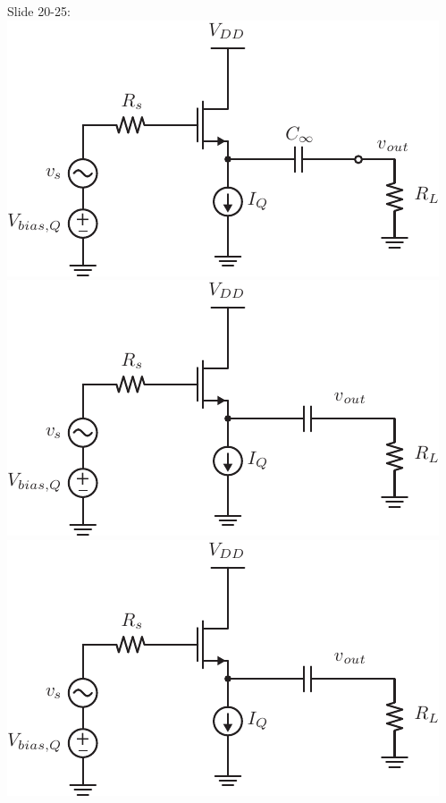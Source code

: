 Slide 20-25:
\includegraphics[width=.75\columnwidth]{cd_amp_dc}
\includegraphics[width=.75\columnwidth]{cd_amp_load}
\includegraphics[width=.75\columnwidth]{cd_amp}

